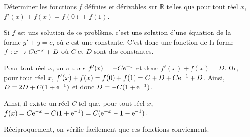 \documentclass[11pt,fleqn, openany]{book} %
\begin{document}
\begin{exercise}Déterminer les fonctions $f$ définies et dérivables sur $\mathbb{R}$ telles que pour tout réel $x$, $f'(x)+f(x)=f(0)+f(1)$.\end{exercise}

\begin{solution}
Si $f$ est une solution de ce problème, c'est une solution d'une équation de la forme $y'+y=c$, où $c$ est une constante. C'est donc une fonction de la forme $f:x\mapsto C\mathrm{e}^{-x}+D$ où $C$ et $D$ sont des constantes.

Pour tout réel $x$, on a alors $f'(x)=-C\mathrm{e}^{-x}$ et donc $f'(x)+f(x)=D$. Or, pour tout réel $x$, $f'(x)+f(x)=f(0)+f(1)=C+D+C\mathrm{e}^{-1}+D$. Ainsi, $D=2D+C(1+\mathrm{e}^{-1})$ et donc $D=-C(1+\mathrm{e}^{-1})$.

Ainsi, il existe un réel $C$ tel que, pour tout réel $x$, $f(x)=C\mathrm{e}^{-x}-C(1+\mathrm{e}^{-1})=C(\mathrm{e}^{-x}-1-\mathrm{e}^{-1})$.

Réciproquement, on vérifie facilement que ces fonctions conviennent.
\end{solution}
\end{document}

